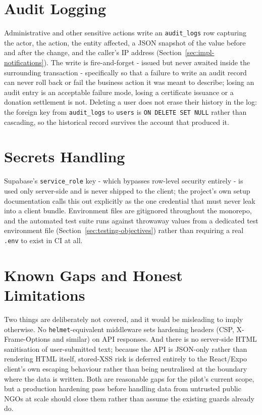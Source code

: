 \section{Audit Logging}
\label{sec:audit-internals}
Administrative and other sensitive actions write an \texttt{audit\_logs} row capturing the actor, the action, the entity affected, a JSON snapshot of the value before and after the change, and the caller's IP address (Section~\ref{sec:impl-notifications}). The write is fire-and-forget - issued but never awaited inside the surrounding transaction - specifically so that a failure to write an audit record can never roll back or fail the business action it was meant to describe; losing an audit entry is an acceptable failure mode, losing a certificate issuance or a donation settlement is not. Deleting a user does not erase their history in the log: the foreign key from \texttt{audit\_logs} to \texttt{users} is \texttt{ON DELETE SET NULL} rather than cascading, so the historical record survives the account that produced it.

\section{Secrets Handling}
\label{sec:secrets}
Supabase's \texttt{service\_role} key - which bypasses row-level security entirely - is used only server-side and is never shipped to the client; the project's own setup documentation calls this out explicitly as the one credential that must never leak into a client bundle. Environment files are gitignored throughout the monorepo, and the automated test suite runs against throwaway values from a dedicated test environment file (Section~\ref{sec:testing-objectives}) rather than requiring a real \texttt{.env} to exist in CI at all.

\section{Known Gaps and Honest Limitations}
\label{sec:security-gaps}
Two things are deliberately not covered, and it would be misleading to imply otherwise. No \texttt{helmet}-equivalent middleware sets hardening headers (CSP, X-Frame-Options and similar) on API responses. And there is no server-side HTML sanitisation of user-submitted text; because the API is JSON-only rather than rendering HTML itself, stored-XSS risk is deferred entirely to the React/Expo client's own escaping behaviour rather than being neutralised at the boundary where the data is written. Both are reasonable gaps for the pilot's current scope, but a production hardening pass before handling data from untrusted public NGOs at scale should close them rather than assume the existing guards already do.

